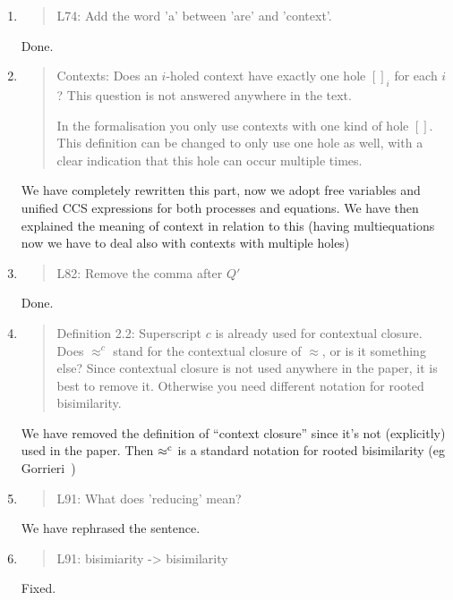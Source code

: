 \begin{enumerate}
\item \begin{quote}
    L74: Add the word 'a' between 'are' and 'context'.
  \end{quote}
  Done.
  
  
\item \begin{quote}
  Contexts: Does an $i$-holed context have exactly one hole $[]_i$ for
  each $i$? This question is not answered anywhere in the text.

  In the formalisation you only use contexts with one kind of hole $[]$. This definition can be changed to only
  use one hole as well, with a clear indication that this hole can occur multiple times.
\end{quote}

We have completely rewritten this part, now we adopt free variables
and unified CCS expressions for both processes and equations.
We have then explained the meaning of context in relation to this 
(having multiequations now we have to deal also with contexts with multiple holes)

\item \begin{quote}
    L82: Remove the comma after $Q'$
  \end{quote}
  Done.
  
\item \begin{quote}
    Definition 2.2: Superscript $c$ is already used for contextual closure.
    Does $\approx^c$ stand for the contextual closure of $\approx$, or is it something else?
    Since contextual closure is not used anywhere in the paper, it is best to remove it.
    Otherwise you need different notation for rooted bisimilarity.
  \end{quote}
  We have removed the definition of ``context closure'' since it's not
  (explicitly) used in the paper.  Then $\mathrel{\approx^{\rm{c}}}$ is a standard
  notation for rooted bisimilarity (eg  Gorrieri~\cite{Gorrieri:2015jt})

  
\item \begin{quote}
    L91: What does 'reducing' mean?
  \end{quote}
We have rephrased the sentence.


\item \begin{quote}
    L91: bisimiarity -> bisimilarity
  \end{quote}
  Fixed.


\end{enumerate}
